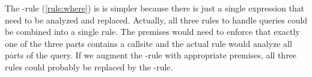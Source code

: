 \iffalse
\begin{figure}[h!]
    \centering\small
  \makebox[\textwidth][c]{
$$\inferrule{
    \exists i \in \{1, ..., n\}: \hasCallsite(T, e_{f_i}) \\
    \neg \hasCallsite(T, ts)\\
    \neg \hasCallsite(T, w) \\\\
    \forall i \in \{1, ..., n\}: T, \varnothing \vdash (\TRUE, t_i) \rightarrow (B_i, R_i)
}{
T, \varnothing \vdash (p, \SELECT~ ts ~\FROM~ t_1 \AS a_1 \otimes ... \otimes  t_n \AS a_n ~\WHERE~ w) \rightarrow \\\\
{\begin{tabular}[b]{LLLL}
         \Big( \big\{ (\SELECT~ p ~\AND~ p_1 ~\AND~ \cdots ~\AND~ p_n,~ \SELECT~ ts ~\FROM~ t'_1 \AS a_1 \otimes ... \otimes  t'_n \AS a_n ~\WHERE~ w ~~)\\
\phantom{\Big( \big\{}| ~((p_1, t'_1), ..., (p_n, t'_n)) \in \times_{\{i|1\leq i \leq n\}} B_i \hspace*{80mm}\big\}, \\
\phantom{\Big(}\big\{ (\SELECT~ p ~\AND~ p_1 ~\AND~ \cdots ~\AND~ p_n,~ \SELECT~ ts ~\FROM~ t'_1 \AS a_1 \otimes ... \otimes  t'_n \AS a_n ~\WHERE~ w ~~)\\
\phantom{\Big( \big\{}| ~ ((p_1, t'_1), ..., (p_n, t'_n)) \in \times_{\{i|1\leq i \leq n\}} (B_i \cup R_i), \exists t' \in \{t'_1, ..., t'_n\} : \hasCallsite(t') \hspace*{17mm}\big\}\Big)\\
\end{tabular}}
}
\quad(\textsc{from})
$$
}
    \caption{\RFROM-rule}
    \label{rule:from}
\end{figure}
\fi

The \RWHERE-rule (\autoref{rule:where}) is is simpler because there is just a single expression that need to be analyzed and replaced. Actually, all three rules to handle queries could be combined into a single rule. The premises would need to enforce that exactly one of the three parts contains a callsite and the actual rule would analyze all parts of the query. If we augment the \REXPR-rule with appropriate premises, all three rules could probably be replaced by the \REXPR-rule.

